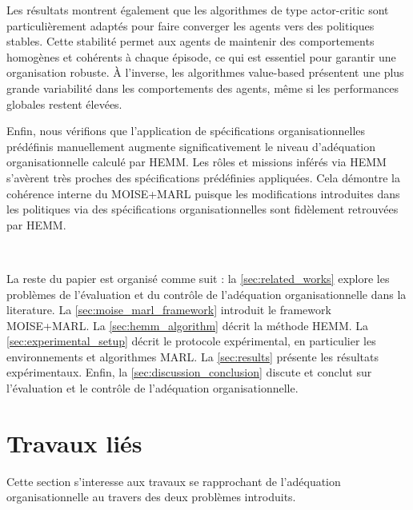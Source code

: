 \documentclass[sigconf,anonymous]{aamas}
\begin{document}
Les résultats montrent également que les algorithmes de type actor-critic
sont particulièrement adaptés pour faire converger les agents vers des politiques stables. Cette stabilité permet aux agents de maintenir des comportements homogènes et cohérents à chaque épisode, ce qui est essentiel pour garantir une organisation robuste. À l'inverse, les algorithmes value-based
présentent une plus grande variabilité dans les comportements des agents, même si les performances globales restent élevées.

Enfin, nous vérifions que l'application de spécifications organisationnelles prédéfinis manuellement augmente significativement le niveau d'adéquation organisationnelle calculé par HEMM. Les rôles et missions inférés via HEMM s'avèrent très proches des spécifications prédéfinies appliquées. Cela démontre la cohérence interne du MOISE+MARL puisque les modifications introduites dans les politiques via des spécifications organisationnelles sont fidèlement retrouvées par HEMM.

\

La reste du papier est organisé comme suit : la \autoref{sec:related_works} explore les problèmes de l'évaluation et du contrôle de l'adéquation organisationnelle dans la literature. La \autoref{sec:moise_marl_framework} introduit le framework MOISE+MARL. La \autoref{sec:hemm_algorithm} décrit la méthode HEMM. La \autoref{sec:experimental_setup} décrit le protocole expérimental, en particulier les environnements et algorithmes MARL. La \autoref{sec:results} présente les résultats expérimentaux. Enfin, la \autoref{sec:discussion_conclusion} discute et conclut sur l'évaluation et le contrôle de l'adéquation organisationnelle.

\section{Travaux liés}
\label{sec:related_works}

Cette section s'interesse aux travaux se rapprochant de l'adéquation organisationnelle au travers des deux problèmes introduits.

\end{document}
